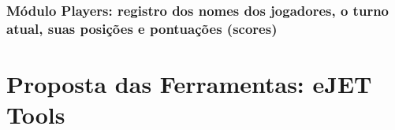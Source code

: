 \subsection{ Módulo Players: registro dos nomes dos jogadores, o turno atual, suas posições e pontuações (scores)}






\chapter{Proposta das Ferramentas: eJET Tools}


